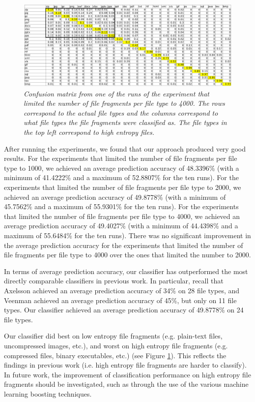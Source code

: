 \documentclass[5p]{elsarticle}
\begin{document}
\begin{figure}[ht!]
\centering
\includegraphics[width=7in]{confuseMatrix4k.ps}
\caption{\textit{Confusion matrix from one of the runs of the experiment that limited the number of file fragments per file type to 4000. The rows correspond to the actual file types and the columns correspond to what file types the file fragments were classified as. The file types in the top left correspond to high entropy files.}\label{fig:ConfusionMatrix4k}}
\end{figure} 

After running the experiments, we found that our approach produced very good results. For the experiments that limited the number of file fragments per file type to 1000, we achieved an average prediction accuracy of 48.3396\% (with a minimum of 41.4222\% and a maximum of 52.8807\% for the ten runs). For the experiments that limited the number of file fragments per file type to 2000, we achieved an average prediction accuracy of 49.8778\% (with a minimum of 45.7562\% and a maximum of 55.9301\% for the ten runs). For the experiments that limited the number of file fragments per file type to 4000, we achieved an average prediction accuracy of 49.4027\% (with a minimum of 44.4398\% and a maximum of 55.6484\% for the ten runs). There was no significant improvement in the average prediction accuracy for the experiments that limited the number of file fragments per file type to 4000 over the ones that limited the number to 2000.

In terms of average prediction accuracy, our classifier has outperformed the most directly comparable classifiers in previous work. In particular, recall that Axelsson \cite{Axelsson10} achieved an average prediction accuracy of 34\% on 28 file types, and Veenman \cite{Veenman07} achieved an average prediction accuracy of 45\%, but only on 11 file types. Our classifier achieved an average prediction accuracy of 49.8778\% on 24 file types.

Our classifier did best on low entropy file fragments (e.g. plain-text files, uncompressed images, etc.), and worst on high entropy file fragments (e.g. compressed files, binary executables, etc.) (see Figure \ref{fig:ConfusionMatrix4k}). This reflects the findings in previous work (i.e. high entropy file fragments are harder to classify). In future work, the improvement of classification performance on high entropy file fragments should be investigated, such as through the use of the various machine learning boosting techniques.
\end{document}
